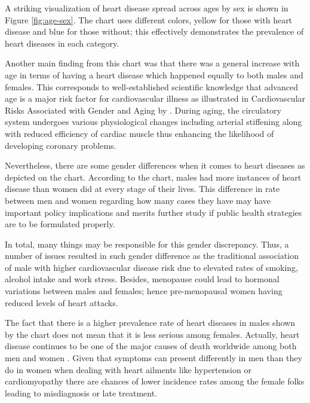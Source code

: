 \documentclass[12pt, a4paper,twoside]{report}
\numberwithin{equation}{chapter}
\begin{document}

A striking visualization of heart disease spread across ages by sex is shown in Figure \ref{fig:age-sex}. The chart uses different colors, yellow for those with heart disease and blue for those without; this effectively demonstrates the prevalence of heart diseases in each category.

Another main finding from this chart was that there was a general increase with age in terms of having a heart disease which happened equally to both males and females. This corresponds to well-established scientific knowledge that advanced age is a major risk factor for cardiovascular illness as illustrated in Cardiovascular Risks Associated with Gender and Aging by \parencite{rodgers}. During aging, the circulatory system undergoes various physiological changes including arterial stiffening along with reduced efficiency of cardiac muscle thus enhancing the likelihood of developing coronary problems.

Nevertheless, there are some gender differences when it comes to heart diseases as depicted on the chart. According to the chart, males had more instances of heart disease than women did at every stage of their lives. This difference in rate between men and women regarding how many cases they have may have important policy implications and merits further study if public health strategies are to be formulated properly.

In total, many things may be responsible for this gender discrepancy. Thus, a number of issues resulted in such gender difference as the traditional association of male with higher cardiovascular disease risk due to elevated rates of smoking, alcohol intake and work stress. Besides, menopause could lead to hormonal variations between males and females; hence pre-menopausal women having reduced levels of heart attacks.

The fact that there is a higher prevalence rate of heart diseases in males shown by the chart does not mean that it is less serious among females. Actually, heart disease continues to be one of the major causes of death worldwide among both men and women \parencite{worldheart}. Given that symptoms can present differently in men than they do in women when dealing with heart ailments like hypertension or cardiomyopathy there are chances of lower incidence rates among the female folks leading to misdiagnosis or late treatment.
\end{document}
